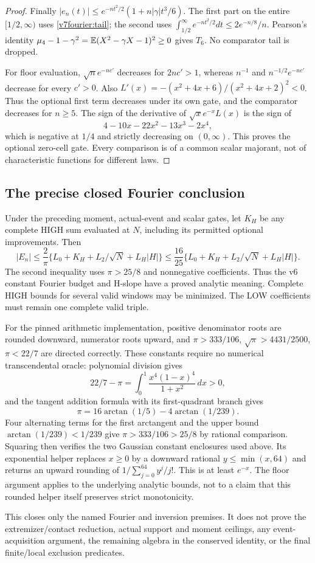 \begin{proof}
Finally $|e_n(t)|\le e^{-nt^2/2}(1+n|\gamma|t^3/6)$.
The first part on the entire $[1/2,\infty)$ uses
\eqref{v7fourier:tail}; the second uses
$\int_{1/2}^\infty e^{-nt^2/2}dt\le2e^{-n/8}/n$.
Pearson's identity $\mu_4-1-\gamma^2=\mathbb E(X^2-\gamma X-1)^2\ge0$
gives $T_6$. No comparator tail is dropped.

For floor evaluation, $\sqrt n e^{-nc'}$ decreases for $2nc'>1$,
whereas $n^{-1}$ and $n^{-1/2}e^{-nc'}$ decrease for every $c'>0$.
Also $L'(x)=-(x^2+4x+6)/(x^2+4x+2)^2<0$.
Thus the optional first term decreases under its own gate, and the
comparator decreases for $n\ge5$. The sign of the derivative of
$\sqrt{x}e^{-x}L(x)$ is the sign of
\[
 4-10x-22x^2-13x^3-2x^4,
\]
which is negative at $1/4$ and strictly decreasing on $(0,\infty)$.
This proves the optional zero-cell gate. Every comparison is of a common
scalar majorant, not of characteristic functions for different laws.
\end{proof}

\subsection{The precise closed Fourier conclusion}

Under the preceding moment, actual-event and scalar gates, let $K_H$ be
any complete HIGH sum evaluated at $N$, including its permitted optional
improvements. Then
\begin{equation}\label{v7fourier:conclusion}
 |E_n|\le\frac2\pi\{L_0+K_H+L_2/\sqrt N+L_H|H|\}
 \le\frac{16}{25}\{L_0+K_H+L_2/\sqrt N+L_H|H|\}.
\end{equation}
The second inequality uses $\pi>25/8$ and nonnegative coefficients.
Thus the v6 constant Fourier budget and H-slope have a proved analytic
meaning. Complete HIGH bounds for several valid windows may be minimized.
The LOW coefficients must remain one complete valid triple.

For the pinned arithmetic implementation, positive denominator roots are
rounded downward, numerator roots upward, and $\pi>333/106$,
$\sqrt\pi>4431/2500$, $\pi<22/7$ are directed correctly.
These constants require no numerical transcendental oracle: polynomial
division gives
\[
 22/7-\pi=\int_0^1\frac{x^4(1-x)^4}{1+x^2}\,dx>0,
\]
and the tangent addition formula with its first-quadrant branch gives
\[
 \pi=16\arctan(1/5)-4\arctan(1/239).
\]
Four alternating terms for the first arctangent and the upper bound
$\arctan(1/239)<1/239$ give $\pi>333/106>25/8$ by rational comparison.
Squaring then verifies the two Gaussian constant enclosures used above.
Its exponential helper replaces $x\ge0$ by a downward rational
$y\le\min(x,64)$ and returns an upward rounding of
$1/\sum_{j=0}^{64}y^j/j!$. This is at least $e^{-x}$.
The floor argument applies to the underlying analytic bounds, not to a
claim that this rounded helper itself preserves strict monotonicity.

This closes only the named Fourier and inversion premises. It does not
prove the extremizer/contact reduction, actual support and moment
ceilings, any event-acquisition argument, the remaining algebra in the
conserved identity, or the final finite/local exclusion predicates.
